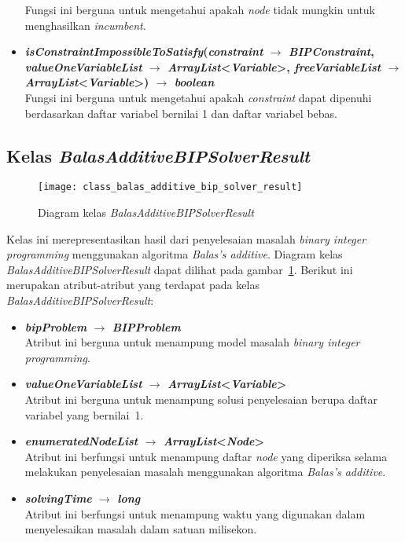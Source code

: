 \begin{itemize}
	Fungsi ini berguna untuk mengetahui apakah \textit{node} tidak mungkin untuk menghasilkan \textit{incumbent}.
	\item \textbf{\textit{isConstraintImpossibleToSatisfy}(\textit{constraint} $\rightarrow$ \textit{BIPConstraint}, \textit{valueOneVariableList} $\rightarrow$ \textit{ArrayList}<\textit{Variable}>, \textit{freeVariableList} $\rightarrow$ \textit{ArrayList}<\textit{Variable}>) $\rightarrow$ \textit{boolean}}\\
	Fungsi ini berguna untuk mengetahui apakah \textit{constraint} dapat dipenuhi berdasarkan daftar variabel bernilai 1 dan daftar variabel bebas.
\end{itemize}

\subsection{Kelas \textit{BalasAdditiveBIPSolverResult}}
\begin{figure}[H]
	\centering  
	\texttt{[image: class\_balas\_additive\_bip\_solver\_result]}
	\caption[Diagram kelas \textit{BalasAdditiveBIPSolverResult}]{Diagram kelas \textit{BalasAdditiveBIPSolverResult}}
	\label{fig:class_balas_additive_bip_solver_result}
\end{figure}
Kelas ini merepresentasikan hasil dari penyelesaian masalah \textit{binary integer programming} menggunakan algoritma \textit{Balas's additive}. Diagram kelas \textit{BalasAdditiveBIPSolverResult} dapat dilihat pada gambar~\ref{fig:class_balas_additive_bip_solver_result}. Berikut ini merupakan atribut-atribut yang terdapat pada kelas \textit{BalasAdditiveBIPSolverResult}:
\begin{itemize}
	\item \textbf{\textit{bipProblem} $\rightarrow$ \textit{BIPProblem}}\\
	Atribut ini berguna untuk menampung model masalah \textit{binary integer programming}.
	\item \textbf{\textit{valueOneVariableList} $\rightarrow$ \textit{ArrayList}<\textit{Variable}>}\\
	Atribut ini berguna untuk menampung solusi penyelesaian berupa daftar variabel yang bernilai~1.
	\item \textbf{\textit{enumeratedNodeList} $\rightarrow$ \textit{ArrayList}<\textit{Node}>}\\
	Atribut ini berfungsi untuk menampung daftar \textit{node} yang diperiksa selama melakukan penyelesaian masalah menggunakan algoritma \textit{Balas's additive}.
	\item \textbf{\textit{solvingTime} $\rightarrow$ \textit{long}}\\
	Atribut ini berfungsi untuk menampung waktu yang digunakan dalam menyelesaikan masalah dalam satuan milisekon.
\end{itemize}